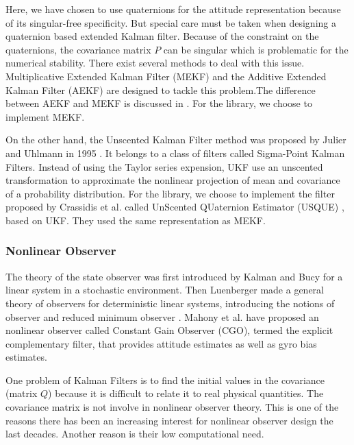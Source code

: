 Here, we have chosen to use quaternions for the attitude representation because of its singular-free specificity. But special care must be taken when designing a quaternion based extended Kalman filter. Because of the constraint on the quaternions, the covariance matrix $P$ can be singular \cite{vik2009integrated} which is problematic for the numerical stability. There exist several methods to deal with this issue. Multiplicative Extended Kalman Filter (MEKF)\cite{markley2003attitude} and the Additive Extended Kalman Filter (AEKF) \cite{bar1991quaternion} are designed to tackle this problem.The difference between AEKF and MEKF is discussed in \cite{markley_multiplicative_2004}. For the library, we choose to implement MEKF.

On the other hand, the Unscented Kalman Filter method was proposed by Julier and Uhlmann \cite{julier_new_1995} in 1995 . It belongs to a class of filters called Sigma-Point Kalman Filters. Instead of using the Taylor series expension, UKF use an unscented transformation \cite{uhlmann1995dynamic} to approximate the nonlinear projection of mean and covariance of a probability distribution. For the library, we choose to implement the filter proposed by Crassidis et al. called UnScented QUaternion Estimator (USQUE) \cite{crassidis_unscented_2003}, based on UKF. They used the same representation as MEKF.

\subsubsection{Nonlinear Observer}

The theory of the state observer was first introduced by Kalman and Bucy for a linear system in a stochastic environment. Then Luenberger \cite{david1971introduction} made a general theory of observers for deterministic linear systems, introducing the notions of observer and reduced minimum observer \cite{primbs1996survey}. Mahony et al. \cite{mahony_nonlinear_2008} have proposed an nonlinear observer called Constant Gain Observer (CGO), termed the explicit complementary filter, that provides attitude estimates as well as gyro bias estimates. 

One problem of Kalman Filters is to find the initial values in the covariance (matrix $Q$) because it is difficult to relate it to real physical quantities. The covariance matrix is not involve in nonlinear observer theory. This is one of the reasons there has been an increasing interest for nonlinear observer design the last decades. Another reason is their low computational need.


